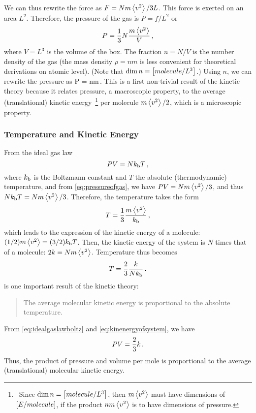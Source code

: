 We can thus rewrite the force as $F = Nm\left\langle{v^2}\right\rangle/3L$. This force is exerted on an area $L^2$. Therefore, the pressure of the gas is $P = f/L^2$ or
\begin{equation}\label{eq:pressureofgas}
P = \dfrac{1}{3}N\dfrac{m\left\langle{v^2}\right\rangle}{V}\,, 
\end{equation}
where $V = L^3$ is the volume of the box. The fraction $n = N/V$ is the number density of the gas (the mass density $\rho = nm$ is less convenient for theoretical derivations on atomic level). (Note that $\dim n = \left[{molecule/L^3}\right]$.) Using $n$, we can rewrite the pressure as
\beq
P = nm\,.
\eeq
This is a first non-trivial result of the kinetic theory because it relates pressure, a macroscopic property, to the average (translational) kinetic energy~\footnote{~Since $\dim n = \left[{molecule/L^3}\right]$, then $m\left\langle{v^2}\right\rangle$ must have dimensions of $\left[{E/molecule}\right]$, if the product $nm\left\langle{v^2}\right\rangle$ is to have dimensions of pressure.} per molecule $m\left\langle{v^2}\right\rangle/2$, which is a microscopic property.


\subsubsection{Temperature and Kinetic Energy}
From the ideal gas law 
\begin{equation}\label{eq:idealgaslawboltz}
PV = Nk_\text{b} T\,,
\end{equation}
where $k_\text{b}$ is the Boltzmann constant and $T$ the absolute (thermodynamic) temperature, and from \cref{eq:pressureofgas}, we have $PV = Nm\left\langle{v^2}\right\rangle/3$, and thus $Nk_\text{b} T = Nm\left\langle{v^2}\right\rangle/3$. Therefore, the temperature takes the form
\begin{equation}\label{eq:tempboltz}
T = \dfrac{1}{3}\dfrac{m\left\langle{v^2}\right\rangle}{k_\text{b}}\,,
\end{equation}
which leads to the expression of the kinetic energy of a molecule: $(1/2)m\left\langle{v^2}\right\rangle = (3/2)k_\text{b} T$. Then, the kinetic energy of the system is $N$ times that of a molecule: $2k = Nm\left\langle{v^2}\right\rangle$. Temperature thus becomes
\begin{equation}\label{eq:kinenergyofsystem}
T = \dfrac{2}{3}\dfrac{k}{Nk_\text{b}}\,.
\end{equation}
 is one important result of the kinetic theory: 
\begin{quote}
The average molecular kinetic energy is proportional to the absolute temperature. 
\end{quote}

From \cref{eq:idealgaslawboltz} and \cref{eq:kinenergyofsystem}, we have
\begin{equation}\label{eq:pressurevolproptoken}
PV = \dfrac{2}{3}k\,.
\end{equation}
Thus, the product of pressure and volume per mole is proportional to the average (translational) molecular kinetic energy.

